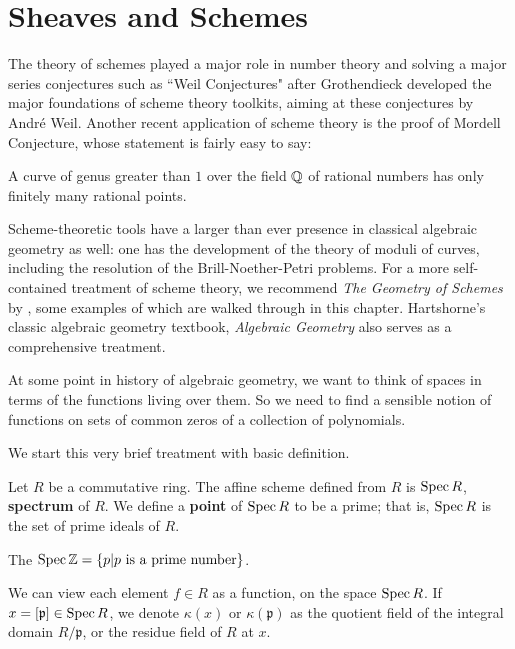 \section{Sheaves and Schemes}
\label{sec:sheaves-and-schemes}
	The theory of schemes played a major role in number theory 
	and solving a major series conjectures 
	such as ``Weil Conjectures" 
	after Grothendieck developed 
	the major foundations of scheme theory toolkits,
	aiming at these conjectures by Andr\'{e} Weil. 
	Another recent application of scheme theory is 
	the proof of Mordell Conjecture,
	whose statement is fairly easy to say:
	
	\begin{theorem}
		A curve of genus greater than $1$ over 
		the field $\mathbb{Q}$ of rational numbers has 
		only finitely many rational points.
	\end{theorem}
	
	Scheme-theoretic tools have a larger than ever presence in classical 
	algebraic geometry as well:
	one has the development of the theory of moduli of curves,
	including the resolution of the Brill-Noether-Petri problems. 
	For a more self-contained treatment of scheme theory,
	we recommend \emph{The Geometry of Schemes}
	by \citet{Eisenbud2000},
	some examples of which are walked through in this chapter.
	Hartshorne's classic algebraic geometry textbook,
	\emph{Algebraic Geometry} also serves
	as a comprehensive treatment. 
	
	At some point in history of algebraic geometry,
	we want to think of spaces in terms of the functions living over them. 	So we need to find a sensible notion of functions on 
	sets of common zeros of a collection of polynomials.

	We start this very brief treatment with basic definition.
	\begin{definition}[Spectrum of $R$]
	    Let $R$ be a commutative ring.
		The affine scheme defined from $R$ is $\operatorname{Spec} R$,
		\textbf{spectrum} of $R$.
		We define a \textbf{point} of $\operatorname{Spec} R$ to be a prime;
		that is, $\operatorname{Spec} R$ is the set of prime ideals of $R$.
	\end{definition}
	
	\begin{example}[$\spec \Z$]
		The $\operatorname{Spec} \mathbb{Z} = \{p | p \text{ is a prime number}\}$.
	\end{example}
	
	We can view each element $f \in R$ as a function, 
	on the space $\operatorname{Spec} R$.
	If $x = [\mathfrak{p}] \in \operatorname{Spec} R$,
	we denote $\kappa(x)$ or $\kappa(\mathfrak{p})$ 
	as the quotient field of the integral domain $R/\mathfrak{p}$,
	or the residue field of $R$ at $x$. 
	
